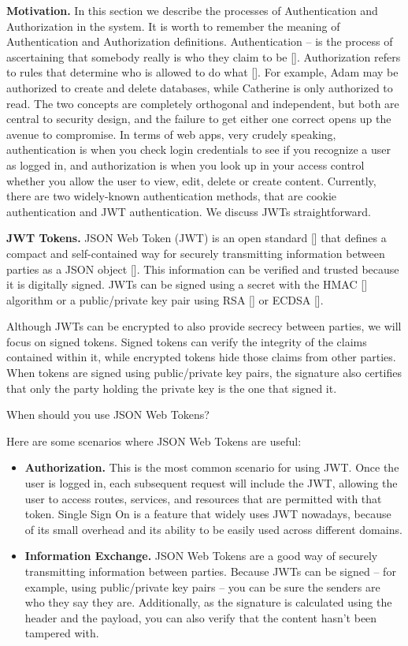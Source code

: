 \textbf{Motivation.} In this section we describe the processes of Authentication and Authorization in the system.
It is worth to remember the meaning of Authentication and Authorization definitions.
Authentication -- is the process of ascertaining that somebody really is who they claim to be [\cite{burrows1989logic}].
Authorization refers to rules that determine who is allowed to do what [\cite{fagin1978authorization}].
For example, Adam may be authorized to create and delete databases, while Catherine is only authorized to read.
The two concepts are completely orthogonal and independent, but both are central to security design, and the
failure to get either one correct opens up the avenue to compromise.
In terms of web apps, very crudely speaking, authentication is when you check login credentials to see if you recognize
a user as logged in, and authorization is when you look up in your access control whether you allow the user to view,
edit, delete or create content.
Currently, there are two widely-known authentication methods, that are cookie authentication and JWT authentication.
We discuss JWTs straightforward.

\textbf{JWT Tokens.}
JSON Web Token (JWT) is an open standard [\cite{jones2015rfc}] that defines a compact and self-contained way for securely
transmitting information between parties as a JSON object [\cite{jones2015json}].
This information can be verified and trusted because it is digitally signed.
JWTs can be signed using a secret with the HMAC [\cite{wang2004hmac}] algorithm or a public/private key pair using
RSA [\cite{wiener1990cryptanalysis}] or ECDSA [\cite{johnson2001elliptic}].

Although JWTs can be encrypted to also provide secrecy between parties, we will focus on signed tokens.
Signed tokens can verify the integrity of the claims contained within it, while encrypted tokens hide those claims from
other parties.
When tokens are signed using public/private key pairs, the signature also certifies that only the party holding the
private key is the one that signed it.

When should you use JSON Web Tokens?

Here are some scenarios where JSON Web Tokens are useful:

\begin{itemize}
    \item \textbf{Authorization.} This is the most common scenario for using JWT. Once the user is logged in, each
    subsequent request will include the JWT, allowing the user to access routes, services, and resources that are permitted
    with that token.
    Single Sign On is a feature that widely uses JWT nowadays, because of its small overhead and its ability to be easily
    used across different domains.
    \item \textbf{Information Exchange.} JSON Web Tokens are a good way of securely transmitting information between
    parties.
    Because JWTs can be signed -- for example, using public/private key pairs -- you can be sure the senders are who they
    say they are.
    Additionally, as the signature is calculated using the header and the payload, you can also verify that the content
    hasn't been tampered with.
\end{itemize}

